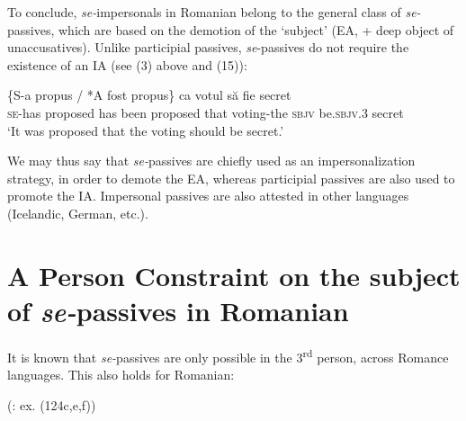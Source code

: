 \documentclass[output=paper]{langsci/langscibook}
\begin{document}
  To conclude, \textit{se-}impersonals in Romanian belong to the general class of \textit{se-}passives, which are based on the demotion of the ‘subject’ (EA, + deep object of unaccusatives). Unlike participial passives, \textit{se}{}-passives do not require the existence of an IA (see (3) above and (15)):

\ea%
    \label{ex:giurgea:15}
    \gll \{S-a      propus    / *A   fost   propus\}   ca   votul          să     fie           secret\\
         \textsc{se-}has proposed    has been proposed that voting-the \textsc{sbjv} be.\textsc{sbjv.3} secret\\
    \glt ‘It was proposed that the voting should be secret.’
    \z

          

We may thus say that \textit{se-}passives are chiefly used as an impersonalization strategy, in order to demote the EA, whereas participial passives are also used to promote the IA. Impersonal passives are also attested in other languages (Icelandic, German, etc.).

\section{A Person Constraint on the subject of \textit{se-}passives in Romanian}%

It is known that \textit{se-}passives are only possible in the 3\textsuperscript{rd} person, across Romance languages. This also holds for Romanian:

\ea%
    (\citealt{Dobrovie-Sorin2017}: ex. (124c,e,f))\label{ex:giurgea:16}\\
    \z
\z
\end{document}
